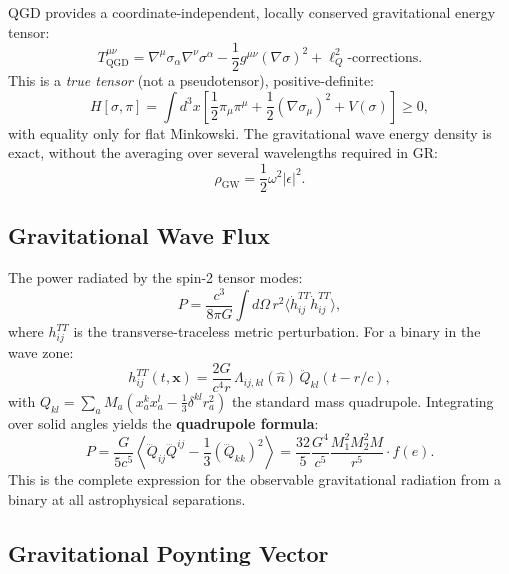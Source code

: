 \documentclass[12pt,a4paper]{article}
\newcommand{\lQ}{\ell_Q}
\begin{document}
QGD provides a coordinate-independent, locally conserved gravitational energy tensor:
\begin{equation}
  \boxed{T^{\mu\nu}_\mathrm{QGD} = \nabla^\mu\sigma_\alpha\nabla^\nu\sigma^\alpha
    - \frac{1}{2}g^{\mu\nu}(\nabla\sigma)^2 + \lQ^2\text{-corrections}.}
\end{equation}
This is a \emph{true tensor} (not a pseudotensor), positive-definite:
\begin{equation}
  H[\sigma,\pi] = \int d^3x\left[\frac{1}{2}\pi_\mu\pi^\mu
    + \frac{1}{2}(\nabla\sigma_\mu)^2 + V(\sigma)\right] \geq 0,
\end{equation}
with equality only for flat Minkowski. The gravitational wave energy density is exact,
without the averaging over several wavelengths required in GR:
\begin{equation}
  \boxed{\rho_\mathrm{GW} = \frac{1}{2}\omega^2|\epsilon|^2.}
\end{equation}

\subsection{Gravitational Wave Flux}

The power radiated by the spin-2 tensor modes:
\begin{equation}
  P = \frac{c^3}{8\pi G}\int d\Omega\,r^2\langle\dot{h}_{ij}^{TT}\dot{h}_{ij}^{TT}\rangle,
\end{equation}
where $h_{ij}^{TT}$ is the transverse-traceless metric perturbation. For a binary
in the wave zone:
\begin{equation}
  h_{ij}^{TT}(t,\mathbf{x}) = \frac{2G}{c^4 r}\,\Lambda_{ij,kl}(\hat{n})\,
    \ddot{Q}_{kl}(t-r/c),
\end{equation}
with $Q_{kl} = \sum_a M_a(x_a^k x_a^l - \tfrac{1}{3}\delta^{kl}r_a^2)$ the standard
mass quadrupole. Integrating over solid angles yields the \textbf{quadrupole formula}:
\begin{equation}
  \boxed{P = \frac{G}{5c^5}\left\langle\dddot{Q}_{ij}\dddot{Q}^{ij}
    - \frac{1}{3}(\dddot{Q}_{kk})^2\right\rangle
    = \frac{32}{5}\frac{G^4}{c^5}\frac{M_1^2M_2^2 M}{r^5}\cdot f(e).}
\end{equation}
This is the complete expression for the observable gravitational radiation from a
binary at all astrophysical separations.

\subsection{Gravitational Poynting Vector}
\end{document}
